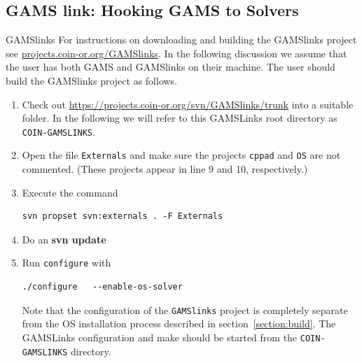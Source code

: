 \documentclass[11pt]{article}
\renewcommand{\_}{{\char"5F}}
\renewcommand{\{}{{\char"7B}}
\renewcommand{\}}{{\char"7D}}
\renewcommand{\^}{{\char"0D}}
\renewcommand{\'}{{\char"0D}}
\begin{document}
\begin{enumerate}[Step 1:]
\subsection{GAMS link:  Hooking GAMS to Solvers}\label{section:gamslinks}


GAMSlinks
For instructions on downloading and building  the GAMSlinks project see \url{projects.coin-or.org/GAMSlinks}.  
In the following discussion we assume that the user has both GAMS and GAMSlinks on their machine.    
The user should build the GAMSlinks project as follows.

\begin{enumerate}[1.]

\item  Check out \url{https://projects.coin-or.org/svn/GAMSlinks/trunk} into a suitable folder. In the following we
will refer to this GAMSLinks root directory as {\tt COIN-GAMSLINKS}.

\item Open the file {\tt Externals} and make sure the projects {\tt cppad} and {\tt OS} are not commented. 
(These projects appear in line 9 and 10, respectively.)

\item Execute the command

\begin{verbatim}
svn propset svn:externals . -F Externals
\end{verbatim}


\item  Do an {\bf svn update}

\item Run {\tt configure} with 

\begin{verbatim}
./configure   --enable-os-solver
\end{verbatim}

Note that the configuration of the {\tt GAMSlinks} project is completely separate from the OS installation process
described in section~\ref{section:build}. The GAMSLinks configuration and make should be started from the 
{\tt COIN-GAMSLINKS} directory.


\end{enumerate}
\end{enumerate}
\end{document}
